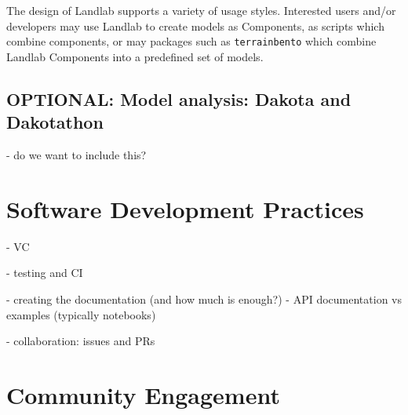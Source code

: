 \documentclass[12pt]{amsart}
\begin{document}
The design of Landlab supports a variety of usage styles. Interested users and/or developers may use Landlab to create models as Components, as scripts which combine components, or may packages such as \texttt{terrainbento} \citep{barnhart2019terrainbento} which combine Landlab Components into a predefined set of models.





\subsection{OPTIONAL: Model analysis: Dakota and Dakotathon}

- do we want to include this?

\section{Software Development Practices}

- VC

- testing and CI

- creating the documentation (and how much is enough?)
   - API documentation vs examples (typically notebooks)

- collaboration: issues and PRs


\section{Community Engagement}
\label{sec:community}
\end{document}
